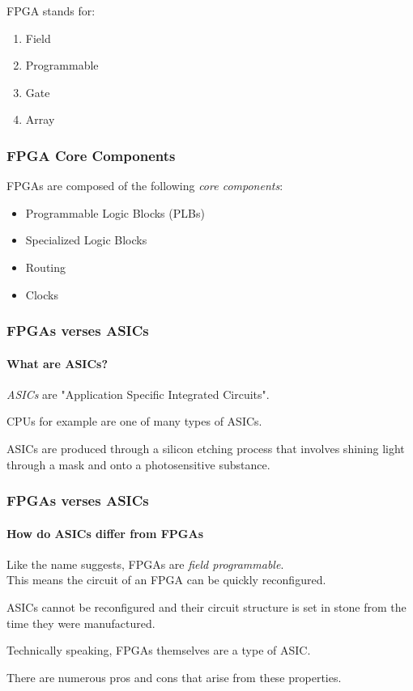 \documentclass{beamer}
\begin{document}
\begin{frame}
\begin{multicols}{2}
    \AlegreyaExtraBold FPGA \ttfamily stands for:
    \begin{enumerate}
      \item Field
      \item Programmable
      \item Gate
      \item Array
    \end{enumerate}
    
    \vspace*{\fill}

    \end{multicols}
    
  \end{frame}
  
  \begin{frame}
    \frametitle{FPGA Core Components}
    FPGAs are composed of the following \textit{core components}:
    \begin{itemize}
      \item Programmable Logic Blocks (PLBs)
      \item Specialized Logic Blocks
      \item Routing
      \item Clocks
    \end{itemize}
  \end{frame}
  
  \begin{frame}
    \frametitle{FPGAs verses ASICs}
    \framesubtitle{What are ASICs?}

    \textit{ASICs} are "Application Specific Integrated Circuits".

    \vfill

    CPUs for example are one of many types of ASICs.

    \vfill

    ASICs are produced through a silicon etching process that
    involves shining light through a mask and onto a photosensitive substance.

  \end{frame}
  
  \begin{frame}
    \frametitle{FPGAs verses ASICs}
    \framesubtitle{How do ASICs differ from FPGAs}

    Like the name suggests, FPGAs are \textit{field programmable}. \\
    This means the circuit of an FPGA can be quickly reconfigured.

    \vfill

    ASICs cannot be reconfigured and their circuit structure
    is set in stone from the time they were manufactured.

    \vfill

    Technically speaking, FPGAs themselves are a type of ASIC.

    \vfill

    There are numerous pros and cons that arise from these properties.

  \end{frame}
\end{document}
